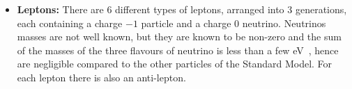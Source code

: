\begin{itemize}[leftmargin=*]
\item\textbf{Leptons:}
  There are 6 different types of leptons,
  arranged into  3 generations, each containing a charge $-1$ particle and a charge 0 neutrino.
  Neutrinos masses are not well known, but they are known to be non-zero
  and the sum of the masses of the three flavours of neutrino is less than a few eV~\cite{theo-nu_mass},
  hence are negligible compared to the other particles of the Standard Model.
  For each lepton there is also an anti-lepton. \vspace{0.5em}

 

\end{itemize}
